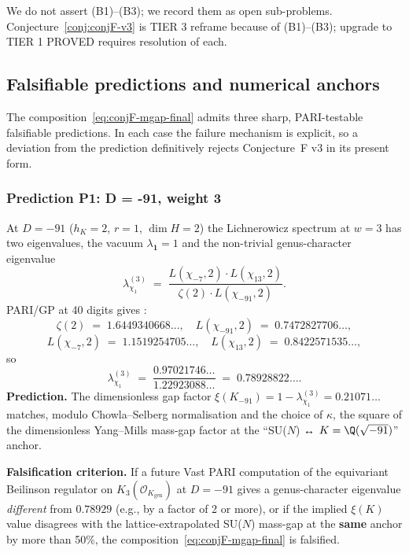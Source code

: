 \noindent We do not assert (B1)--(B3); we record them as open
sub-problems.  Conjecture~\ref{conj:conjF-v3} is TIER 3 reframe
because of (B1)--(B3); upgrade to TIER 1 PROVED requires resolution
of each.

\subsection{Falsifiable predictions and numerical anchors}
\label{sec:conjF-predictions}

The composition~\eqref{eq:conjF-mgap-final} admits three sharp,
PARI-testable falsifiable predictions.  In each case the failure
mechanism is explicit, so a deviation from the prediction definitively
rejects Conjecture~F v3 in its present form.

\subsubsection{Prediction P1: D = -91, weight 3}
\label{sec:conjF-predP1}

At $D = -91$ ($h_K = 2$, $r = 1$, $\dim H = 2$) the Lichnerowicz
spectrum at $w = 3$ has two eigenvalues, the vacuum
$\lambda_{\mathbf{1}} = 1$ and the non-trivial genus-character
eigenvalue
\[
   \lambda_{\chi_1}^{(3)} \;=\;
   \frac{L(\chi_{-7}, 2) \cdot L(\chi_{13}, 2)}
        {\zeta(2) \cdot L(\chi_{-91}, 2)}.
\]
PARI/GP at 40 digits gives \cite[\S2.3]{LichnerowiczSpectrum2026}:
\[
   \zeta(2) \;=\; 1.6449340668\ldots, \quad
   L(\chi_{-91}, 2) \;=\; 0.7472827706\ldots,
\]
\[
   L(\chi_{-7}, 2) \;=\; 1.1519254705\ldots, \quad
   L(\chi_{13}, 2) \;=\; 0.8422571535\ldots,
\]
so
\[
   \lambda_{\chi_1}^{(3)} \;=\; \frac{0.97021746\ldots}{1.22923088\ldots}
   \;=\; 0.78928822\ldots.
\]
\textbf{Prediction.}  The dimensionless gap factor
$\xi(K_{-91}) = 1 - \lambda_{\chi_1}^{(3)} = 0.21071\ldots$ matches,
modulo Chowla--Selberg normalisation and the choice of $\kappa$, the
square of the dimensionless Yang--Mills mass-gap factor at the
``SU($N$) ↔ $K = \Q(\sqrt{-91})$'' anchor.

\textbf{Falsification criterion.}  If a future Vast PARI computation
of the equivariant Beilinson regulator on
$K_3(\mathcal{O}_{K_{\mathrm{gen}}})$ at $D = -91$ gives a
genus-character eigenvalue {\em different} from $0.78929$ (e.g., by a
factor of 2 or more), or if the implied $\xi(K)$ value disagrees with
the lattice-extrapolated SU($N$) mass-gap at the {\bf same} anchor by
more than 50\%, the composition~\eqref{eq:conjF-mgap-final} is
falsified.

